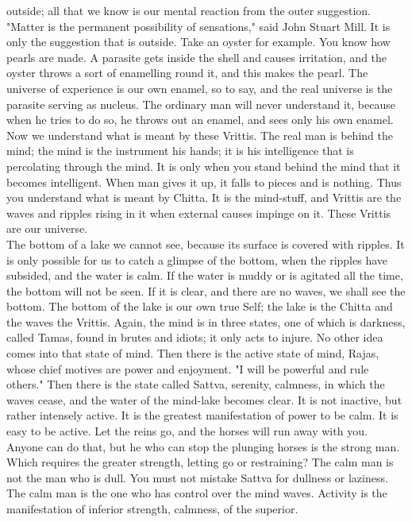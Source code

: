 outside; all that we know is our mental reaction from the outer
suggestion. "Matter is the permanent possibility of sensations," said
John Stuart Mill. It is only the suggestion that is outside. Take an
oyster for example. You know how pearls are made. A parasite gets
inside the shell and causes irritation, and the oyster throws a sort of
enamelling round it, and this makes the pearl. The universe of
experience is our own enamel, so to say, and the real universe is the
parasite serving as nucleus. The ordinary man will never understand it,
because when he tries to do so, he throws out
an enamel, and sees only his own enamel. Now we understand what is
meant by these Vrittis. The real man is behind the mind; the mind is
the instrument his hands; it is his intelligence that is percolating
through the mind. It is only when you stand behind the mind that it
becomes intelligent. When man gives it up, it falls to pieces and is
nothing. Thus you understand what is meant by Chitta. It is the
mind-stuff, and Vrittis are the waves and ripples rising in it when
external causes impinge on it. These Vrittis are our universe. \\

The bottom of a lake we cannot see, because its surface is
covered with ripples. It is only possible for us to catch a glimpse of
the bottom, when the ripples have subsided, and the water is calm. If
the water is muddy or is agitated all the time, the bottom will not be
seen. If it is clear, and there are no waves, we shall see the bottom.
The bottom of the lake is our own true Self; the lake is the Chitta and
the waves the Vrittis. Again, the mind is in three states, one of which
is darkness, called Tamas, found in brutes and idiots; it only acts to
injure. No other idea comes into that state of mind. Then there is the
active state of mind, Rajas, whose chief motives are power and
enjoyment. "I will be powerful and rule others." Then there is the
state called Sattva, serenity, calmness, in which the waves cease, and
the water of the mind-lake becomes clear. It is not inactive, but
rather intensely active. It is the greatest manifestation of power to
be calm. It is easy to be active. Let the reins go, and the horses will
run away with you. Anyone can do that, but he who can stop the plunging
horses is the strong man. Which requires the greater strength, letting
go or restraining? The calm man is not the man who is dull. You must
not mistake Sattva for dullness or laziness. The calm man is the one
who has control over the mind waves. Activity is the manifestation of
inferior strength, calmness, of the superior. \\

